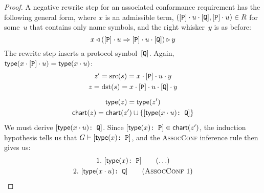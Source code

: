 \documentclass[../generics]{subfiles}
\begin{document}
\begin{proof}
 A negative rewrite step for an associated conformance requirement has the following general form, where $x$ is an admissible term, $([\texttt{P}]\cdot u\cdot [\texttt{Q}],[\texttt{P}]\cdot u)\in R$ for some~$u$ that contains only name symbols, and the right whisker~$y$ is as before:
\[x\triangleleft ([\texttt{P}]\cdot u\Rightarrow[\texttt{P}]\cdot u\cdot[\texttt{Q}])\triangleright y\]
The rewrite step inserts a protocol symbol~$[\texttt{Q}]$. Again, $\mathsf{type}(x\cdot [\texttt{P}] \cdot u)=\mathsf{type}(x\cdot u)$:
\begin{gather*}
z^\prime=\operatorname{src}(s)=x\cdot[\texttt{P}]\cdot u\cdot y\\
z=\operatorname{dst}(s)=x\cdot[\texttt{P}]\cdot u\cdot[\texttt{Q}]\cdot y\\[\medskipamount]
\mathsf{type}(z)=\mathsf{type}(z^\prime)\\
\mathsf{chart}(z)=\mathsf{chart}(z^\prime) \cup \{[\texttt{$\mathsf{type}(x\cdot u)$:~Q}]\}
\end{gather*}
We must derive $[\texttt{$\mathsf{type}(x\cdot u)$:~Q}]$. Since $[\texttt{$\mathsf{type}(x)$:~P}]\in\mathsf{chart}(z^\prime)$, the induction hypothesis tells us that $G\vdash[\texttt{$\mathsf{type}(x)$:~P}]$, and the \textsc{AssocConf} inference rule then gives us:
\begin{gather*}
\AnyStep{\ConfReq{$\Type(x)$}{P}}{1}\\
\AssocConfStep{1}{$\Type(x\cdot u)$}{Q}{2}
\end{gather*}


\end{proof}
\end{document}
